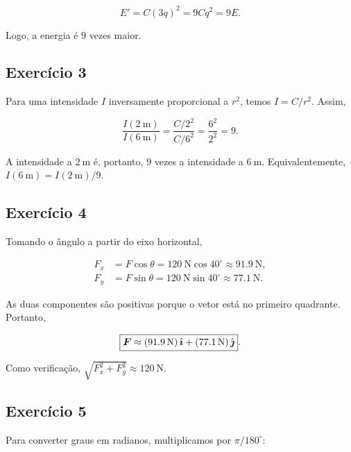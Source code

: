 \begin{equation}
  E'=C(3q)^2=9Cq^2=9E.
\end{equation}

Logo, a energia é \(\boxed{9}\) vezes maior.

\subsection*{Exercício 3}

Para uma intensidade \(I\) inversamente proporcional a \(r^2\), temos \(I=C/r^2\). Assim,

\begin{equation}
  \frac{I(\SI{2}{\meter})}{I(\SI{6}{\meter})}
  =\frac{C/2^2}{C/6^2}
  =\frac{6^2}{2^2}
  =9.
\end{equation}

A intensidade a \(\SI{2}{\meter}\) é, portanto, \(\boxed{9}\) vezes a intensidade a \(\SI{6}{\meter}\). Equivalentemente, \(I(\SI{6}{\meter})=I(\SI{2}{\meter})/9\).

\subsection*{Exercício 4}

Tomando o ângulo a partir do eixo horizontal,

\begin{align}
  F_x &= F\cos\theta
       =\SI{120}{\newton}\cos 40^\circ
       \approx\SI{91.9}{\newton},\\
  F_y &= F\sin\theta
       =\SI{120}{\newton}\sin 40^\circ
       \approx\SI{77.1}{\newton}.
\end{align}

As duas componentes são positivas porque o vetor está no primeiro quadrante. Portanto,

\begin{equation}
  \boxed{\boldsymbol{F}\approx
  (\SI{91.9}{\newton})\,\hat{\boldsymbol{\imath}}
  +(\SI{77.1}{\newton})\,\hat{\boldsymbol{\jmath}}}.
\end{equation}

Como verificação, \(\sqrt{F_x^2+F_y^2}\approx\SI{120}{\newton}\).

\subsection*{Exercício 5}

Para converter graus em radianos, multiplicamos por \(\pi/180^\circ\):

